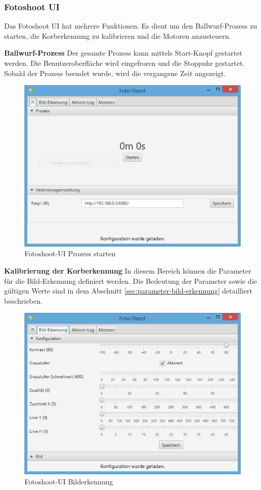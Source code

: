\subsubsection{Fotoshoot UI}

Das Fotoshoot UI hat mehrere Funktionen. Es dient um den Ballwurf-Prozess zu starten, die Korberkennung zu kalibrieren und die Motoren anzusteuern.

\noindent
\textbf{Ballwurf-Prozess}
Der gesamte Prozess kann mittels Start-Knopf gestartet werden. Die Benutzeroberfläche wird eingefroren und die Stoppuhr gestartet. Sobald der Prozess beendet wurde, wird die vergangene Zeit angezeigt.

\begin{figure}[h!]
\centering
\includegraphics[width=0.7\linewidth]{../../fig/fotoshoot-ui/fotoshoot-ui-pi}
\caption{Fotoshoot-UI Prozess starten}
\label{fig:fotoshoot-ui-pi}
\end{figure}

\noindent
\textbf{Kalibrierung der Korberkennung}
In diesem Bereich können die Parameter für die Bild-Erkennung definiert werden. Die Bedeutung der Parameter sowie die gültigen Werte sind in dem Abschnitt \ref{sec:parameter-bild-erkennung} detailliert beschrieben.

\begin{figure}[h!]
	\centering
	\includegraphics[width=0.7\linewidth]{../../fig/fotoshoot-ui/fotoshoot-ui-korb-erkennung}
	\caption{Fotoshoot-UI Bilderkennung}
	\label{fig:fotoshoot-ui-korb-erkennung}
\end{figure}

